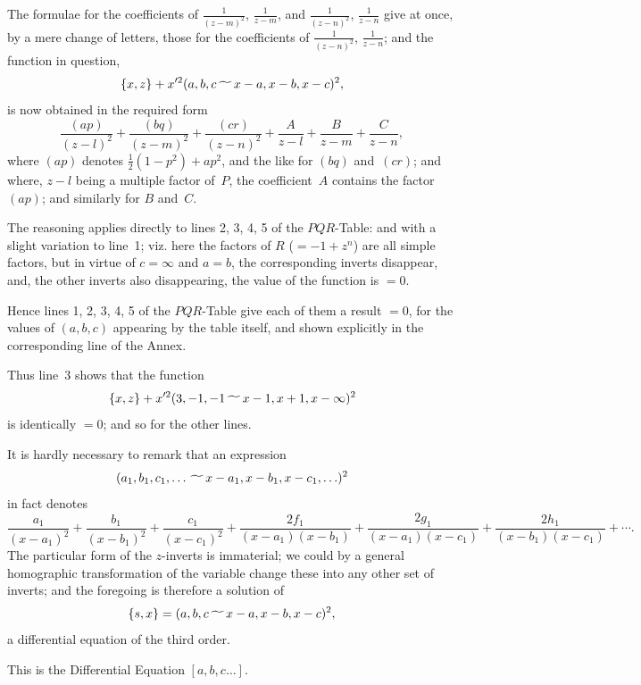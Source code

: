 \documentclass[11pt,a4paper]{book}
\begin{document}
\begin{art}
The formulae for the coefficients of $\frac{1}{(z-m)^2}$, $\frac{1}{z-m}$, and
$\frac{1}{(z-n)^2}$, $\frac{1}{z-n}$ give at once, by a mere change of letters,
those for the coefficients of $\frac{1}{(z-n)^2}$, $\frac{1}{z-n}$; and the
function in question,
\[
\{x, z\} + x'^2 (a, b, c \,\raisebox{-.5ex}{$\widetilde{\phantom{aa}}$}\, x-a, x-b, x-c)^2,
\]
is now obtained in the required form
\[
\frac{(ap)}{(z-l)^2} + \frac{(bq)}{(z-m)^2} + \frac{(cr)}{(z-n)^2}
+ \frac{A}{z-l} + \frac{B}{z-m} + \frac{C}{z-n},
\]
where $(ap)$ denotes $\frac{1}{2}(1-p^2) + ap^2$, and the like for $(bq)$ and~$(cr)$;
and where, $z-l$ being a multiple factor of~$P$, the coefficient~$A$ contains
the factor~$(ap)$; and similarly for $B$ and~$C$.
\end{art}


\begin{art}
The reasoning applies directly to lines 2, 3, 4, 5 of the $PQR$-Table:
and with a slight variation to line~1; viz. here the factors of $R$
($= -1 + z^n$) are all simple factors, but in virtue of $c = \infty$ and
$a = b$, the corresponding inverts disappear, and, the other inverts also
disappearing, the value of the function is $=0$.

Hence lines 1, 2, 3, 4, 5 of the $PQR$-Table give each of them a result
$=0$, for the values of $(a, b, c)$ appearing by the table itself, and shown
explicitly in the corresponding line of the Annex.

Thus line~3 shows that the function
\[
\{x, z\} + x'^2 (3, -1, -1 \,\raisebox{-.5ex}{$\widetilde{\phantom{aa}}$}\, x-1, x+1, x-\infty)^2
\]
is identically $=0$; and so for the other lines.
\end{art}

\begin{art}
It is hardly necessary to remark that an expression
\[
(a_1, b_1, c_1, \ldots \,\raisebox{-.5ex}{$\widetilde{\phantom{aa}}$}\, x-a_1, x-b_1, x-c_1, \ldots)^2
\]
in fact denotes
\[
\frac{a_1}{(x-a_1)^2} + \frac{b_1}{(x-b_1)^2} + \frac{c_1}{(x-c_1)^2}
+ \frac{2f_1}{(x-a_1)(x-b_1)} + \frac{2g_1}{(x-a_1)(x-c_1)}
+ \frac{2h_1}{(x-b_1)(x-c_1)} + \cdots.
\]
The particular form of the $z$-inverts is immaterial; we could by a
general homographic transformation of the variable change these into any
other set of inverts; and the foregoing is therefore a solution of
\[
\{s, x\} = (a, b, c \,\raisebox{-.5ex}{$\widetilde{\phantom{aa}}$}\, x-a, x-b, x-c)^2,
\]
a differential equation of the third order.

This is the Differential Equation $[a, b, c \ldots]$.
\end{art}
\end{document}
